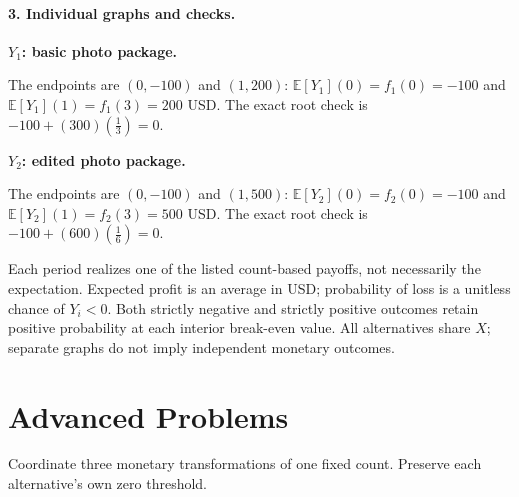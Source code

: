 \clearpage\paragraph{3. Individual graphs and checks.}
\textbf{$Y_1$: basic photo package.}
\begin{center}\end{center}
The endpoints are $(0,-100)$ and $(1,200)$: $\mathbb E[Y_1](0)=f_1(0)=-100$ and
$\mathbb E[Y_1](1)=f_1(3)=200$ USD.
The exact root check is $-100+(300)(\frac{1}{3})=0$.
\par\medskip
\textbf{$Y_2$: edited photo package.}
\begin{center}\end{center}
The endpoints are $(0,-100)$ and $(1,500)$: $\mathbb E[Y_2](0)=f_2(0)=-100$ and
$\mathbb E[Y_2](1)=f_2(3)=500$ USD.
The exact root check is $-100+(600)(\frac{1}{6})=0$.
\par\medskip
Each period realizes one of the listed count-based payoffs, not necessarily the expectation.
Expected profit is an average in USD; probability of loss is a unitless chance of $Y_i<0$.
Both strictly negative and strictly positive outcomes retain positive probability at each interior break-even value.
All alternatives share $X$; separate graphs do not imply independent monetary outcomes.
\clearpage\section{Advanced Problems}\label{sec:t2-c4-advanced}
Coordinate three monetary transformations of one fixed count. Preserve each alternative's own zero threshold.

